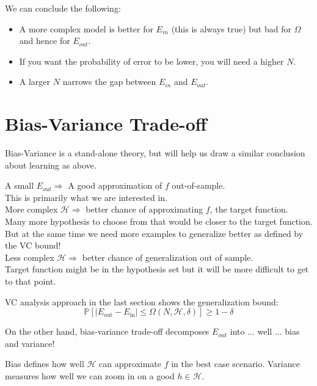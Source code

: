 \documentclass[10pt]{article}
\numberwithin{equation}{section}  %
\begin{document}
We can conclude the following:
\begin{itemize}
    \item A more complex model is better for $E_{in}$ (this is always true) but bad for $\Omega$ and hence for $E_{out}$.
	\item If you want the probability of error to be lower, you will need a higher $N$.
	\item A larger $N$ narrows the gap between $E_{in}$ and $E_{out}$.
\end{itemize}


\section{Bias-Variance Trade-off}

Bias-Variance is a stand-alone theory, but will help us draw a similar conclusion about learning as above.

A small $E_{out}\Longrightarrow$ A good approximation of $f$ out-of-sample.\\
This is primarily what we are interested in.\\
More complex $\mathcal{H}\Longrightarrow$ better chance of approximating $f$, the target function.\\
Many more hypothesis to choose from that would be closer to the target function. But at the same time we need more examples to generalize better as defined by the VC bound!\\
Less complex $\mathcal{H}\Longrightarrow$ better chance of generalization out of sample.\\
Target function might be in the hypothesis set but it will be more difficult to get to that point.

VC analysis approach in the last section shows the generalization bound:
\begin{equation}
    \mathbb{P}[\vert E_\mathrm{out}-E_\mathrm{in}\vert \leq \Omega(N,\mathcal{H},\delta)]\geq 1-\delta
\end{equation}

On the other hand, bias-variance trade-off decomposes $E_{out}$ into ... well ... bias and variance!

Bias defines how well $\mathcal{H}$ can approximate $f$ in the best case scenario. Variance measures how well we can zoom in on a good $h\in \mathcal{H}$.
\end{document}

